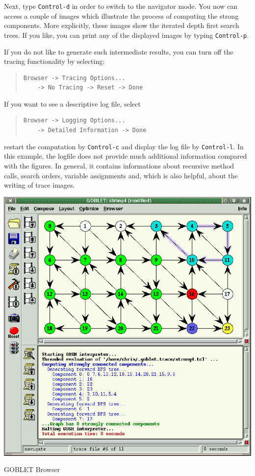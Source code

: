 \documentclass[a4paper,11pt,twoside]{book}
\begin{document}
\begin{multicols}{2}
\noindent
Next, type \verb/Control-d/ in order to switch to the navigator mode. You now
can access a couple of images which illustrate the process of computing the
strong components. More explicitly, these images show the iterated depth first
search trees. If you like, you can print any of the displayed images by typing
\verb/Control-p/.

If you do not like to generate such intermediate results, you can turn off the
tracing functionality by selecting:
\begin{quote}
\begin{verbatim}
Browser -> Tracing Options...
    -> No Tracing -> Reset -> Done
\end{verbatim}
\end{quote}
If you want to see a descriptive log file, select
\begin{quote}
\begin{verbatim}
Browser -> Logging Options...
    -> Detailed Information -> Done
\end{verbatim}
\end{quote}
restart the computation by \verb/Control-c/ and display the log file by
\verb/Control-l/. In this example, the logfile does not provide much additional
information compared with the figures. In general, it contains informations
about recursive method calls, search orders, variable assignments and, which is
also helpful, about the writing of trace images.

\bigskip
\begin{figurehere}
\begin{center}
\includegraphics*[scale=0.5]{browse.ps}
\vspace{0.5cm}
\caption{\label{flb_browse}GOBLET Browser}
\end{center}
\end{figurehere}


\end{multicols}
\end{document}
